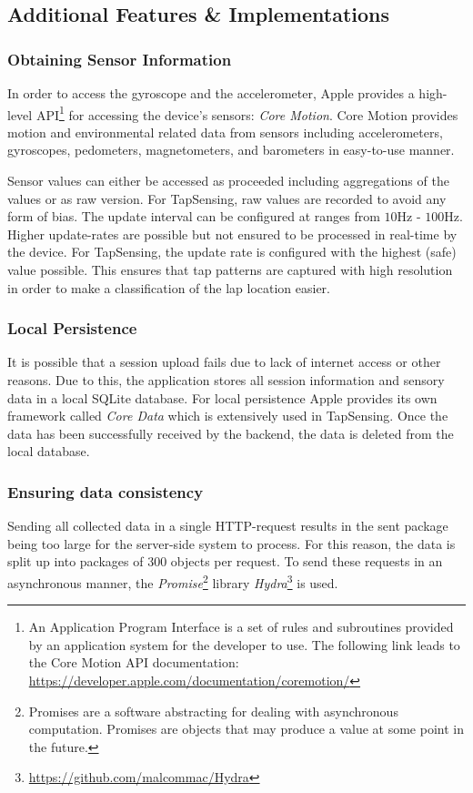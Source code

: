 \subsection{Additional Features \& Implementations}
\subsubsection{Obtaining Sensor Information}
In order to access the gyroscope and the accelerometer, Apple provides a high-level API\footnote{An Application Program Interface is a set of rules and subroutines provided by an application system for the developer to use. The following link leads to the Core Motion API documentation: \url{https://developer.apple.com/documentation/coremotion/} } for accessing the device's sensors: \textit{Core Motion}. Core Motion provides motion and environmental related data from sensors including accelerometers, gyroscopes, pedometers, magnetometers, and barometers in easy-to-use manner.

Sensor values can either be accessed as proceeded including aggregations of the values or as raw version. For TapSensing, raw values are recorded to avoid any form of bias. The update interval can be configured at ranges from $10$Hz - $100$Hz. Higher update-rates are possible but not ensured to be processed in real-time by the device. For TapSensing, the update rate is configured with the highest (safe) value possible. This ensures that tap patterns are captured with high resolution in order to make a classification of the lap location easier.
\subsubsection{Local Persistence}
It is possible that a session upload fails due to lack of internet access or other reasons. Due to this, the application stores all session information and sensory data in a local SQLite database. For local persistence Apple provides its own framework called \textit{Core Data} which is extensively used in TapSensing. Once the data has been successfully received by the backend, the data is deleted from the local database.
\subsubsection{Ensuring data consistency}
Sending all collected data in a single HTTP-request results in the sent package being too large for the server-side system to process. For this reason, the data is split up into packages of 300 objects per request. To send these requests in an asynchronous manner, the \textit{Promise}\footnote{Promises are a software abstracting for dealing with asynchronous computation. Promises are objects that may produce a value at some point in the future.}\cite{Liskov:1988:PLS:53990.54016} library \textit{Hydra}\footnote{\url{https://github.com/malcommac/Hydra}} is used.

